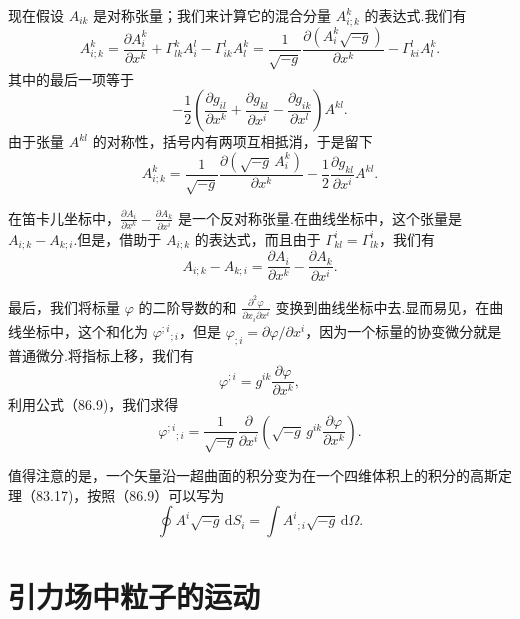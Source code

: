 现在假设 $A_{ik}$ 是对称张量；我们来计算它的混合分量 $A^k_{i;k}$ 的表达式.我们有
\begin{equation*}
  A^k_{i;k}=\frac{\partial A^k_i}{\partial x^k}
  +\Gamma^k_{lk}A^l_i-\Gamma^l_{ik}A^k_l
  =\frac{1}{\sqrt{-g}}\frac{\partial(A^k_i\sqrt{-g})}{\partial x^k}
  -\Gamma^l_{ki}A^k_l.
\end{equation*}
其中的最后一项等于
\begin{equation*}
  -\frac{1}{2}\left(\frac{\partial g_{il}}{\partial x^k}
  +\frac{\partial g_{kl}}{\partial x^i}
  -\frac{\partial g_{ik}}{\partial x^l}\right)A^{kl}.
\end{equation*}
由于张量 $A^{kl}$ 的对称性，括号内有两项互相抵消，于是留下
\begin{equation}
  A^k_{i;k}=\frac{1}{\sqrt{-g}}
  \frac{\partial(\sqrt{-g}\,A^k_i)}{\partial x^k}
  -\frac{1}{2}\frac{\partial g_{kl}}{\partial x^i}A^{kl}.
\end{equation}

在笛卡儿坐标中，$\frac{\partial A_i}{\partial x^k}-\frac{\partial A_k}{\partial x^i}$ 是一个反对称张量.在曲线坐标中，这个张量是 $A_{i;k}-A_{k;i}$.但是，借助于 $A_{i;k}$ 的表达式，而且由于 $\Gamma^i_{kl}=\Gamma^i_{lk}$，我们有
\begin{equation}
  A_{i;k}-A_{k;i}=\frac{\partial A_i}{\partial x^k}
  -\frac{\partial A_k}{\partial x^i}.
\end{equation}

最后，我们将标量 $\varphi$ 的二阶导数的和 $\frac{\partial^2\varphi}{\partial x_i\partial x^i}$ 变换到曲线坐标中去.显而易见，在曲线坐标中，这个和化为 $\varphi^{;i}{}_{;i}$，但是 $\varphi_{;i}=\partial\varphi/\partial x^i$，因为一个标量的协变微分就是普通微分.将指标上移，我们有
\begin{equation*}
  \varphi^{;i}=g^{ik}\frac{\partial\varphi}{\partial x^k},
\end{equation*}
利用公式（86.9)，我们求得
\begin{equation}
  \varphi^{;i}{}_{;i}=\frac{1}{\sqrt{-g}}
  \frac{\partial}{\partial x^i}\left(\sqrt{-g}\,g^{ik}
  \frac{\partial\varphi}{\partial x^k}\right).
\end{equation}

值得注意的是，一个矢量沿一超曲面的积分变为在一个四维体积上的积分的高斯定理（83.17)，按照（86.9）可以写为
\begin{equation}
  \oint A^i\sqrt{-g}\,\mathrm{d}S_i
  =\int A^i{}_{;i}\sqrt{-g}\,\mathrm{d}\varOmega.
\end{equation}

\section{引力场中粒子的运动}

